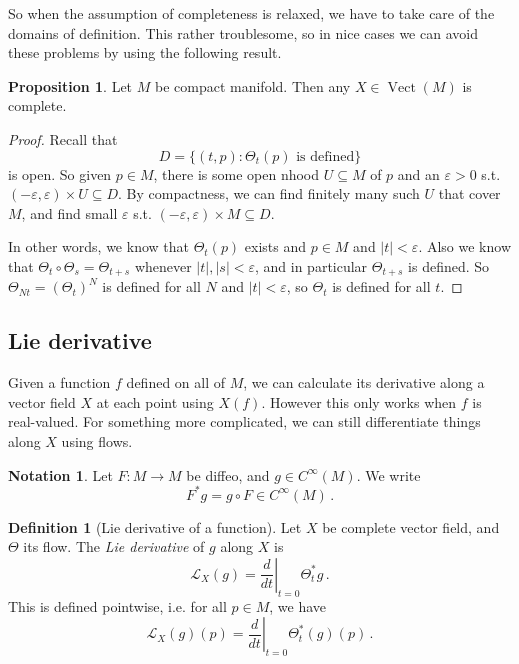 \documentclass[a4paper,11pt]{article}
\theoremstyle{definition}
\newtheorem*{defn}{Definition}
\newtheorem*{prop}{Proposition}
\newtheorem*{notn}{Notation}
\DeclareMathOperator{\Vect}{Vect}
\numberwithin{equation}{section}
\begin{document}
So when the assumption of completeness is relaxed, we have to take care of the domains of definition. This rather troublesome, so in nice cases we can avoid these problems by using the following result.

\begin{prop}
Let $M$ be compact manifold. Then any $X\in\Vect(M)$ is complete.
\end{prop}

\begin{proof}
Recall that
\[
D=\{(t,p):\Theta_t(p)\text{ is defined}\}
\]
is open. So given $p\in M$, there is some open nhood $U\subseteq M$ of $p$ and an $\varepsilon>0$ s.t. $(-\varepsilon,\varepsilon)\times U\subseteq D$. By compactness, we can find finitely many such $U$ that cover $M$, and find small $\varepsilon$ s.t. $(-\varepsilon,\varepsilon)\times M\subseteq D$.

In other words, we know that $\Theta_t(p)$ exists and $p\in M$ and $|t|<\varepsilon$. Also we know that $\Theta_t\circ\Theta_s=\Theta_{t+s}$ whenever $|t|,|s|<\varepsilon$, and in particular $\Theta_{t+s}$ is defined. So $\Theta_{Nt}=(\Theta_t)^N$ is defined for all $N$ and $|t|<\varepsilon$, so $\Theta_t$ is defined for all $t$.
\end{proof}

\subsection{Lie derivative}

Given a function $f$ defined on all of $M$, we can calculate its derivative along a vector field $X$ at each point using $X(f)$. However this only works when $f$ is real-valued. For something more complicated, we can still differentiate things along $X$ using flows.

\begin{notn}
Let $F:M\rightarrow M$ be diffeo, and $g\in C^\infty(M)$. We write
\[
F^*g=g\circ F\in C^\infty(M)\,.
\]
\end{notn}

\begin{defn}[Lie derivative of a function]
Let $X$ be complete vector field, and $\Theta$ its flow. The \emph{Lie derivative} of $g$ along $X$ is
\[
\mathcal{L}_X(g)=\left.\frac{d}{dt}\right|_{t=0}\Theta^*_tg\,.
\]
This is defined pointwise, i.e. for all $p\in M$, we have
\[
\mathcal{L}_X(g)(p)=\left.\frac{d}{dt}\right|_{t=0}\Theta^*_t(g)(p)\,.
\]
\end{defn}
\end{document}
